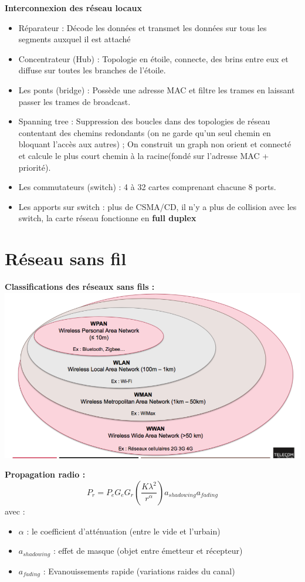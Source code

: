 \documentclass[a4paper,9pt, twocolumn]{article}
\begin{document}
\textbf{Interconnexion des réseau locaux}
\begin{itemize}
\item Réparateur : Décode les données et transmet les données sur tous les segments auxquel il est attaché
\item Concentrateur (Hub) : Topologie en étoile, connecte, des brins entre eux et diffuse sur toutes les branches de l'étoile.
\item Les ponts (bridge) : Possède une adresse MAC et filtre les trames en  laissant passer les trames de broadcast.
\item Spanning tree : Suppression des boucles dans des topologies de réseau contentant des chemins redondants (on ne garde qu'un seul chemin en bloquant l'accès aux autres) ; On construit un graph non orient et connecté et calcule le plus court chemin à la racine(fondé sur l'adresse MAC + priorité).
\item Les commutateurs (switch) : 4 à 32 cartes comprenant chacune 8 ports.
\item Les apports sur switch : plus de CSMA/CD, il n'y a plus de collision avec les switch, la carte réseau fonctionne en \textbf{full duplex}
\end{itemize}

\section*{Réseau sans fil}
\textbf{Classifications des réseaux sans fils :} 
\includegraphics[scale=0.6]{res.png}

\textbf{Propagation radio : } 
$$ P_{r}=P_{e}G_{e}G_{r}(\dfrac{K\lambda ^{2}}{r^{\alpha}})a_{shadowing}a_{fading}$$
avec : 
\begin{itemize}
\item $\alpha$ : le coefficient d'atténuation (entre le vide et l'urbain)
\item $a_{shadowing}$ : effet de masque (objet entre émetteur et récepteur)
\item $a_{fading}$ : Evanouissements rapide (variations raides du canal)
\end{itemize}
\end{document}
